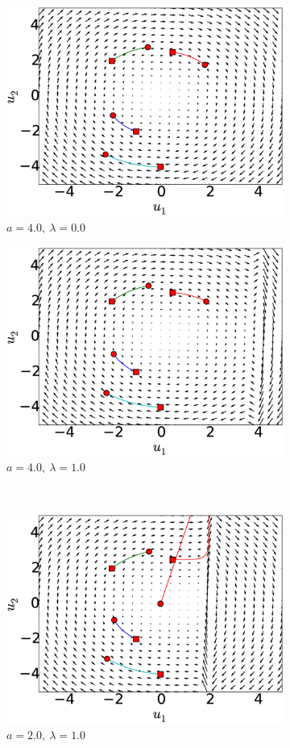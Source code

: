\documentclass[12pt, a4paper]{extreport}
\begin{document}
%
\begin{figure}[H]
	\centering
	\begin{subfigure}[h]{8.0 cm}
		\includegraphics[width=8.0 cm]{figure/phase_a40_lambda0.eps}
		\caption{$a=4.0,\ \lambda = 0.0$}
	\end{subfigure}
	\begin{subfigure}[h]{8.0 cm}
        \includegraphics[width=8.0 cm]{figure/phase_a40_lambda10.eps}
		\caption{$a=4.0,\ \lambda = 1.0$}
    \end{subfigure}
    \\
    \begin{subfigure}[h]{8.0 cm}
		\includegraphics[width=8.0 cm]{figure/phase_a20_lambda10.eps}
		\caption{$a=2.0,\ \lambda = 1.0$}
	\end{subfigure}
	\begin{subfigure}[h]{8.0 cm}

\end{subfigure}
\end{figure}
\end{document}
